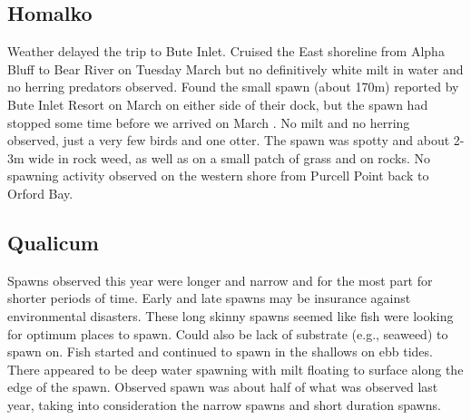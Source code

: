 \subsection{Homalko}

Weather delayed the trip to Bute Inlet.
Cruised the East shoreline from Alpha Bluff to Bear River
on Tuesday March  but no definitively white milt in water and
no herring predators observed.
Found the small spawn (about 170m) reported by Bute Inlet Resort
on March  on either side of their dock, but
the spawn had stopped some time before we arrived on March .
No milt and no herring observed, just a very few birds and one otter.
The spawn was spotty and about 2-3m wide in rock weed, as well as
on a small patch of grass and on rocks.
No spawning activity observed on the western shore
from Purcell Point back to Orford Bay.


\subsection{Qualicum}

Spawns observed this year were longer and narrow and for the most part
for shorter periods of time.
Early and late spawns may be insurance against environmental disasters.
These long skinny spawns seemed like fish
were looking for optimum places to spawn.
Could also be lack of substrate (e.g., seaweed) to spawn on.
Fish started and continued to spawn in the shallows on ebb tides.
There appeared to be deep water spawning
with milt floating to surface along the edge of the spawn.
Observed spawn was about half of what was observed last year,
taking into consideration the narrow spawns and short duration spawns.


